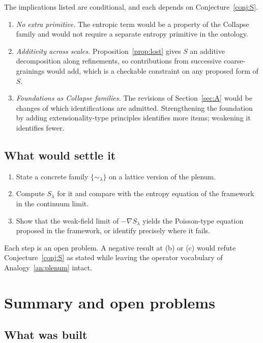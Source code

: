 \documentclass[11pt]{article}
\theoremstyle{definition}
\theoremstyle{plain}
\theoremstyle{remark}
\begin{document}
The implications listed are conditional, and each depends on Conjecture~\ref{conj:S}.
\begin{enumerate}[label=(\roman*)]
\item \emph{No extra primitive.} The entropic term would be a property of the Collapse family and would not require a separate entropy primitive in the ontology.
\item \emph{Additivity across scales.} Proposition~\ref{prop:lost} gives $S$ an additive decomposition along refinements, so contributions from successive coarse-grainings would add, which is a checkable constraint on any proposed form of $S$.
\item \emph{Foundations as Collapse families.} The revisions of Section~\ref{sec:A} would be changes of which identifications are admitted. Strengthening the foundation by adding extensionality-type principles identifies more items; weakening it identifies fewer.
\end{enumerate}

\subsection{What would settle it}

\begin{enumerate}[label=(\alph*)]
\item State a concrete family $\{\sim_\lambda\}$ on a lattice version of the plenum.
\item Compute $S_\lambda$ for it and compare with the entropy equation of the framework in the continuum limit.
\item Show that the weak-field limit of $-\nabla S_\lambda$ yields the Poisson-type equation proposed in the framework, or identify precisely where it fails.
\end{enumerate}
Each step is an open problem. A negative result at (b) or (c) would refute Conjecture~\ref{conj:S} as stated while leaving the operator vocabulary of Analogy~\ref{an:plenum} intact.

\section{Summary and open problems}\label{sec:summary}

\subsection{What was built}
\end{document}
